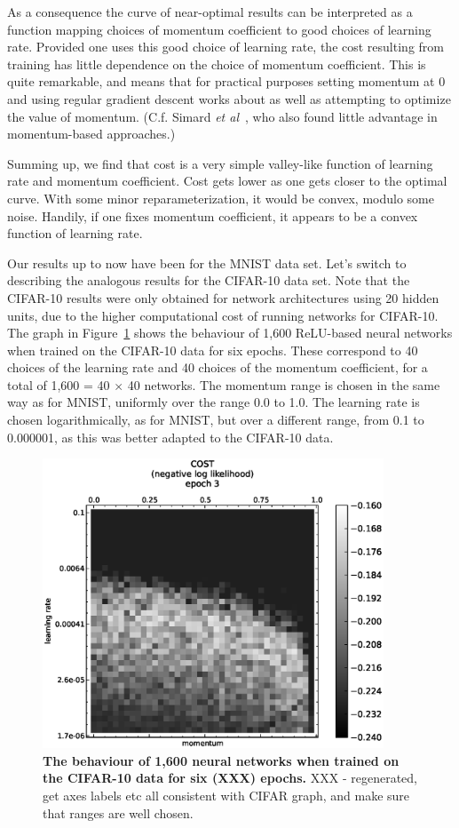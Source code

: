 \documentclass[10pt]{article}
\begin{document}
As a consequence the curve of near-optimal results can be interpreted
as a function mapping choices of momentum coefficient to good choices
of learning rate. Provided one uses this good choice of learning rate,
the cost resulting from training has little dependence on the choice
of momentum coefficient.  This is quite remarkable, and means that for
practical purposes setting momentum at 0 and using regular gradient
descent works about as well as attempting to optimize the value of
momentum.  (C.f. Simard \emph{et al}~\cite{Simard2003a}, who also
found little advantage in momentum-based approaches.)

Summing up, we find that cost is a very simple valley-like function of
learning rate and momentum coefficient. Cost gets lower as one gets
closer to the optimal curve. With some minor reparameterization, it
would be convex, modulo some noise. Handily, if one fixes momentum
coefficient, it appears to be a convex function of learning rate.

%
%
Our results up to now have been for the MNIST data set.  Let's switch
to describing the analogous results for the CIFAR-10 data set.  Note
that the CIFAR-10 results were only obtained for network architectures
using 20 hidden units, due to the higher computational cost of running
networks for CIFAR-10.  The graph in Figure~\ref{fig:cifar_basic}
shows the behaviour of 1,600 ReLU-based neural networks when trained
on the CIFAR-10 data for six epochs. These correspond to 40 choices of
the learning rate and 40 choices of the momentum coefficient, for a
total of 1,600 = 40 $\times$ 40 networks.  The momentum range is
chosen in the same way as for MNIST, uniformly over the range 0.0 to
1.0.  The learning rate is chosen logarithmically, as for MNIST, but
over a different range, from 0.1 to 0.000001, as this was better
adapted to the CIFAR-10 data.

\begin{figure}[!ht]
\begin{center}
\includegraphics[width=4in]{plots/detailed/LF-20R10R-20T10-CIFAR-3.eps}
\end{center}
\caption{ {\bf The behaviour of 1,600 neural networks when trained on
    the CIFAR-10 data for six (XXX) epochs.} XXX - regenerated, get
  axes labels etc all consistent with CIFAR graph, and make sure that
  ranges are well chosen.}
\label{fig:cifar_basic}
\end{figure}
\end{document}
